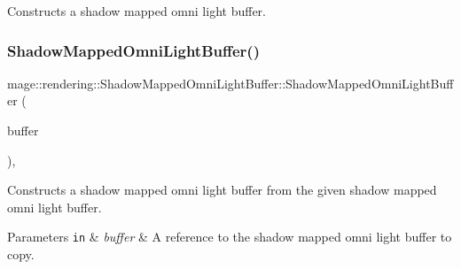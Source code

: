 Constructs a shadow mapped omni light buffer. \hypertarget{structmage_1_1rendering_1_1_shadow_mapped_omni_light_buffer_a42ed551f04a7c53200e68e45c5ab9be5}{}\label{structmage_1_1rendering_1_1_shadow_mapped_omni_light_buffer_a42ed551f04a7c53200e68e45c5ab9be5} 
\subsubsection{\texorpdfstring{Shadow\+Mapped\+Omni\+Light\+Buffer()}{ShadowMappedOmniLightBuffer()}\hspace{0.1cm}{\footnotesize\ttfamily [2/3]}}
{\footnotesize\ttfamily mage\+::rendering\+::\+Shadow\+Mapped\+Omni\+Light\+Buffer\+::\+Shadow\+Mapped\+Omni\+Light\+Buffer (\begin{DoxyParamCaption}\item[{const \hyperlink{structmage_1_1rendering_1_1_shadow_mapped_omni_light_buffer}{Shadow\+Mapped\+Omni\+Light\+Buffer} \&}]{buffer }\end{DoxyParamCaption})\hspace{0.3cm}{\ttfamily [default]}, {\ttfamily [noexcept]}}

Constructs a shadow mapped omni light buffer from the given shadow mapped omni light buffer.


\begin{DoxyParams}[1]{Parameters}
\mbox{\tt in}  & {\em buffer} & A reference to the shadow mapped omni light buffer to copy. \\
\hline
\end{DoxyParams}
\hypertarget{structmage_1_1rendering_1_1_shadow_mapped_omni_light_buffer_a7fb986d0697bdea8ac54f45c188f2a4b}{}\label{structmage_1_1rendering_1_1_shadow_mapped_omni_light_buffer_a7fb986d0697bdea8ac54f45c188f2a4b} 
